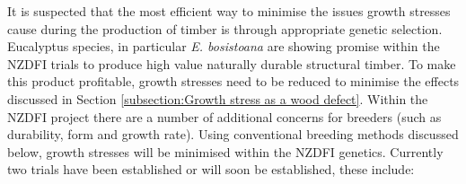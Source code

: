 It is suspected that the most efficient way to minimise the issues growth
stresses cause during the production of timber is through appropriate genetic
selection. Eucalyptus species, in particular \textit{E. bosistoana} are showing
promise within the NZDFI trials to produce high value naturally durable
structural timber. To make this
product profitable, growth stresses need to be reduced to minimise the effects
discussed in Section \ref{subsection:Growth stress as a wood defect}. Within the NZDFI project there are a number of
additional concerns for breeders (such as durability, form and growth rate). Using conventional breeding methods
discussed below, growth stresses will be minimised within the NZDFI genetics.
Currently two trials have been established or will soon be established, these
include: